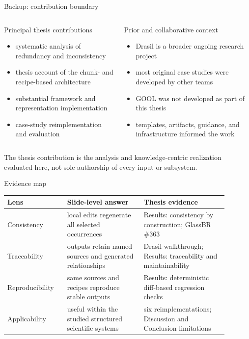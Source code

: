 \documentclass[aspectratio=169,10pt]{beamer}
\newcommand{\claim}[1]{%
  \begin{center}
    \setlength{\fboxsep}{7pt}%
    \colorbox{drasilblue!9}{\parbox{0.88\linewidth}{\centering #1}}%
  \end{center}
}
\begin{document}
\begin{frame}{Backup: contribution boundary}
\small
\begin{columns}[T,onlytextwidth]
\begin{block}{Principal thesis contributions}
\begin{itemize}
  \item systematic analysis of redundancy and inconsistency
  \item thesis account of the chunk- and recipe-based architecture
  \item substantial framework and representation implementation
  \item case-study reimplementation and evaluation
\end{itemize}
\end{block}
\begin{block}{Prior and collaborative context}
\begin{itemize}
  \item Drasil is a broader ongoing research project
  \item most original case studies were developed by other teams
  \item GOOL was not developed as part of this thesis
  \item templates, artifacts, guidance, and infrastructure informed the work
\end{itemize}
\end{block}
\end{columns}
\claim{The thesis contribution is the analysis and knowledge-centric realization evaluated here, not sole authorship of every input or subsystem.}
\end{frame}

\begin{frame}{Evidence map}
\small
\renewcommand{\arraystretch}{1.22}
\begin{tabular}{>{\raggedright\arraybackslash}p{0.24\linewidth} >{\raggedright\arraybackslash}p{0.31\linewidth} >{\raggedright\arraybackslash}p{0.34\linewidth}}
\toprule
\textbf{Lens} & \textbf{Slide-level answer} & \textbf{Thesis evidence}\\
\midrule
Consistency & local edits regenerate all selected occurrences & Results: consistency by construction; GlassBR \#363\\[0.4em]
Traceability & outputs retain named sources and generated relationships & Drasil walkthrough; Results: traceability and maintainability\\[0.4em]
Reproducibility & same sources and recipes reproduce stable outputs & Results: deterministic diff-based regression checks\\[0.4em]
Applicability & useful within the studied structured scientific systems & six reimplementations; Discussion and Conclusion limitations\\
\bottomrule
\end{tabular}
\end{frame}
\end{document}
